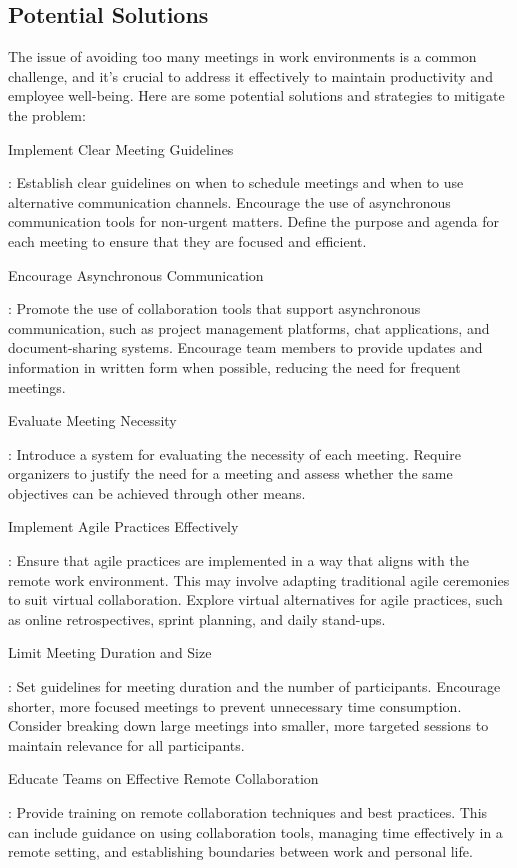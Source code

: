 \subsection{Potential Solutions}
The issue of avoiding too many meetings in work environments is a common challenge, and it's crucial to address it effectively to maintain productivity and employee well-being. Here are some potential solutions and strategies to mitigate the problem:
\begin{enumerate}
{\bfseries \item  Implement Clear Meeting Guidelines}:
Establish clear guidelines on when to schedule meetings and when to use alternative communication channels. Encourage the use of asynchronous communication tools for non-urgent matters.
Define the purpose and agenda for each meeting to ensure that they are focused and efficient.
{\bfseries \item  Encourage Asynchronous Communication}:
Promote the use of collaboration tools that support asynchronous communication, such as project management platforms, chat applications, and document-sharing systems.
Encourage team members to provide updates and information in written form when possible, reducing the need for frequent meetings.
{\bfseries \item  Evaluate Meeting Necessity}:
Introduce a system for evaluating the necessity of each meeting. Require organizers to justify the need for a meeting and assess whether the same objectives can be achieved through other means.
{\bfseries \item  Implement Agile Practices Effectively}:
Ensure that agile practices are implemented in a way that aligns with the remote work environment. This may involve adapting traditional agile ceremonies to suit virtual collaboration.
Explore virtual alternatives for agile practices, such as online retrospectives, sprint planning, and daily stand-ups.
{\bfseries \item  Limit Meeting Duration and Size}:
Set guidelines for meeting duration and the number of participants. Encourage shorter, more focused meetings to prevent unnecessary time consumption.
Consider breaking down large meetings into smaller, more targeted sessions to maintain relevance for all participants.
{\bfseries \item  Educate Teams on Effective Remote Collaboration}:
Provide training on remote collaboration techniques and best practices. This can include guidance on using collaboration tools, managing time effectively in a remote setting, and establishing boundaries between work and personal life.

\end{enumerate}
